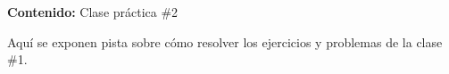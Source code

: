 {\Large\textbf{Contenido:} Clase práctica \#2}

Aquí se exponen pista sobre cómo resolver los ejercicios y problemas de la clase \#1.